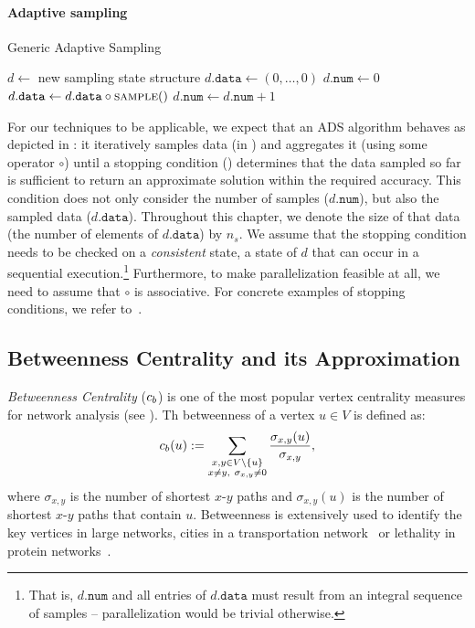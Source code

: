 \paragraph{Adaptive sampling}
%
\begin{algorithm}[bt]
\caption{Generic Adaptive Sampling}
\label{algo:generic-adaptive-sampling}
\begin{algorithmic}[1]
	\State $d \gets$ new sampling state structure
	\State $d\mathtt{.data} \gets (0, \ldots, 0)$ 
	\State $d\mathtt{.num} \gets 0$ 
		\State $d\mathtt{.data} \gets d\mathtt{.data} \circ \Call{sample}{\null}$
		\State $d\mathtt{.num} \gets d\mathtt{.num} + 1$
	\EndWhile
\end{algorithmic}
\end{algorithm}
%
For our techniques to be applicable, we expect that an ADS
algorithm behaves as depicted in : it
iteratively samples data (in ) and aggregates it
(using some operator $\circ$) until a stopping condition ()
determines that the data sampled so far is sufficient to
return an approximate solution within the required accuracy.
This condition does not only consider the number of samples
($d\mathtt{.num}$),
but also the sampled data
($d\mathtt{.data}$). Throughout this chapter, we denote the size
of that data (\ie the number of elements of $d.\mathtt{data}$) by $n_s$.
We assume that the stopping condition needs to be checked on
a \emph{consistent} state, \ie a state of $d$ that can
occur in a sequential
execution.\footnote{That is, $d\mathtt{.num}$ and all entries of $d\mathtt{.data}$ must
result from an integral sequence of samples -- parallelization
would be trivial otherwise.}
Furthermore, to make parallelization feasible at all, we need to assume
that $\circ$ is associative.
For concrete examples of stopping conditions, we refer
to~.

\subsection{Betweenness Centrality and its Approximation}
\label{sec:betw-apx:betw-apx}
%
\emph{Betweenness Centrality} ($c_b$) is one of the most popular vertex
centrality measures for network analysis (see
).
Th betweenness of a vertex $u \in V$ is defined as:
%
\[
\betw(u) := \sum_{\substack{x,y \in V \setminus \set{u}\\x\neq y,\ \sigma_{x,y} \neq 0}}
\frac{\sigma_{x,y}(u)}{\sigma_{x,y}},
\]
%
where $\sigma_{x, y}$ is the number of shortest $x$-$y$ paths and $\sigma_{x, y}(u)$
is the number of shortest $x$-$y$ paths that contain $u$.
Betweenness is extensively used to identify the key vertices in large networks,
\eg cities in a transportation network~\cite{guimera2005worldwide} or lethality
in protein networks~\cite{jeong2001lethality}.

